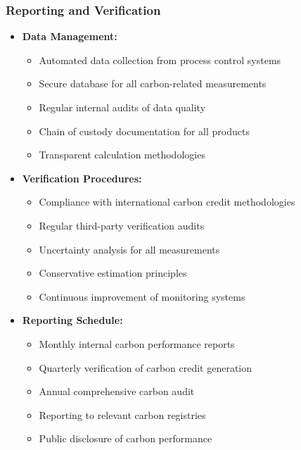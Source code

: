 \subsubsection{Reporting and Verification}
\begin{itemize}
    \item \textbf{Data Management:}
    \begin{itemize}
        \item Automated data collection from process control systems
        \item Secure database for all carbon-related measurements
        \item Regular internal audits of data quality
        \item Chain of custody documentation for all products
        \item Transparent calculation methodologies
    \end{itemize}
    
    \item \textbf{Verification Procedures:}
    \begin{itemize}
        \item Compliance with international carbon credit methodologies
        \item Regular third-party verification audits
        \item Uncertainty analysis for all measurements
        \item Conservative estimation principles
        \item Continuous improvement of monitoring systems
    \end{itemize}
    
    \item \textbf{Reporting Schedule:}
    \begin{itemize}
        \item Monthly internal carbon performance reports
        \item Quarterly verification of carbon credit generation
        \item Annual comprehensive carbon audit
        \item Reporting to relevant carbon registries
        \item Public disclosure of carbon performance
    \end{itemize}
\end{itemize}
